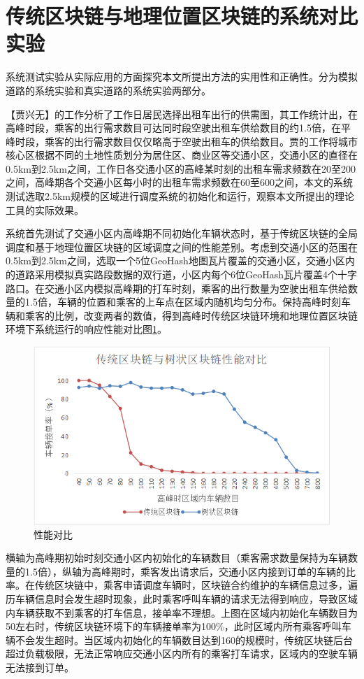 \section{传统区块链与地理位置区块链的系统对比实验}

系统测试实验从实际应用的方面探究本文所提出方法的实用性和正确性。分为模拟道路的系统实验和真实道路的系统实验两部分。

【贾兴无】的工作分析了工作日居民选择出租车出行的供需图，其工作统计出，在高峰时段，乘客的出行需求数目可达同时段空驶出租车供给数目的约1.5倍，在平峰时段，乘客的出行需求数目仅仅略高于空驶出租车的供给数目。贾的工作将城市核心区根据不同的土地性质划分为居住区、商业区等交通小区，交通小区的直径在0.5km到2.5km之间，工作日各交通小区的高峰某时刻的出租车需求频数在20至200之间，高峰期各个交通小区每小时的出租车需求频数在60至600之间，本文的系统测试选取2.5km规模的区域进行调度系统的初始化和运行，观察本文所提出的理论工具的实际效果。

系统首先测试了交通小区内高峰期不同初始化车辆状态时，基于传统区块链的全局调度和基于地理位置区块链的区域调度之间的性能差别。考虑到交通小区的范围在0.5km到2.5km之间，选取一个5位GeoHash地图瓦片覆盖的交通小区，交通小区内的道路采用模拟真实路段数据的双行道，小区内每个6位GeoHash瓦片覆盖4个十字路口。在交通小区内模拟高峰期的打车时刻，乘客的出行数量为空驶出租车供给数量的1.5倍，车辆的位置和乘客的上车点在区域内随机均匀分布。保持高峰时刻车辆和乘客的比例，改变两者的数值，得到高峰时传统区块链环境和地理位置区块链环境下系统运行的响应性能对比图\ref{fig:compare}。

\begin{figure}
  \centering
  \includegraphics[width=1.0\textwidth]{figures/性能对比}
  \caption{性能对比}\label{fig:compare}
\end{figure}

横轴为高峰期初始时刻交通小区内初始化的车辆数目（乘客需求数量保持为车辆数量的1.5倍），纵轴为高峰期时，乘客发出请求后，交通小区内接到订单的车辆的比率。在传统区块链中，乘客申请调度车辆时，区块链合约维护的车辆信息过多，遍历车辆信息时会发生超时现象，此时乘客呼叫车辆的请求无法得到响应，导致区域内车辆获取不到乘客的打车信息，接单率不理想。上图在区域内初始化车辆数目为50左右时，传统区块链环境下的车辆接单率为100$\%$，此时区域内所有乘客呼叫车辆不会发生超时。当区域内初始化的车辆数目达到160的规模时，传统区块链后台超过负载极限，无法正常响应交通小区内所有的乘客打车请求，区域内的空驶车辆无法接到订单。


